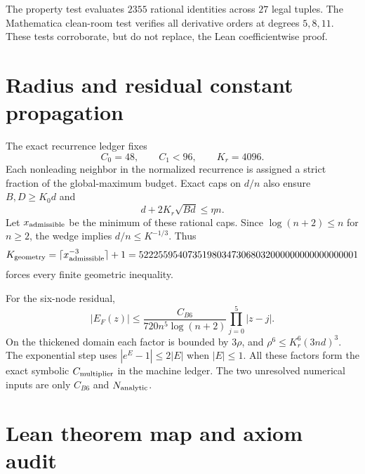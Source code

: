\documentclass[10pt]{article}
\begin{document}
The property test evaluates $2355$ rational identities across $27$ legal
tuples.  The Mathematica clean-room test verifies all derivative orders at
degrees $5,8,11$.  These tests corroborate, but do not replace, the Lean
coefficientwise proof.

\section{Radius and residual constant propagation}\label{sup:effectivity}

The exact recurrence ledger fixes
\[
 C_0=48,\qquad C_1<96,\qquad K_r=4096.
\]
Each nonleading neighbor in the normalized recurrence is assigned a strict
fraction of the global-maximum budget.  Exact caps on $d/n$ also ensure
$B,D\ge K_0d$ and
\[
 d+2K_r\sqrt{Bd}\le\eta n.
\]
Let $x_{\rm admissible}$ be the minimum of these rational caps.  Since
$\log(n+2)\le n$ for $n\ge2$, the wedge implies
$d/n\le K^{-1/3}$.  Thus
\[
 K_{\rm geometry}=\lceil x_{\rm admissible}^{-3}\rceil+1
 =522255954073519803473068032000000000000000001
\]
forces every finite geometric inequality.

For the six-node residual,
\[
 |E_F(z)|\le\frac{C_{B6}}{720n^5\log(n+2)}
 \prod_{j=0}^{5}|z-j|.
\]
On the thickened domain each factor is bounded by $3\rho$, and
$\rho^6\le K_r^6(3nd)^3$.  The exponential step uses
$|e^E-1|\le2|E|$ when $|E|\le1$.  All these factors form the exact symbolic
$C_{\rm multiplier}$ in the machine ledger.  The two unresolved numerical
inputs are only $C_{B6}$ and $N_{\rm analytic}$.

\section{Lean theorem map and axiom audit}\label{sup:lean}
\end{document}
